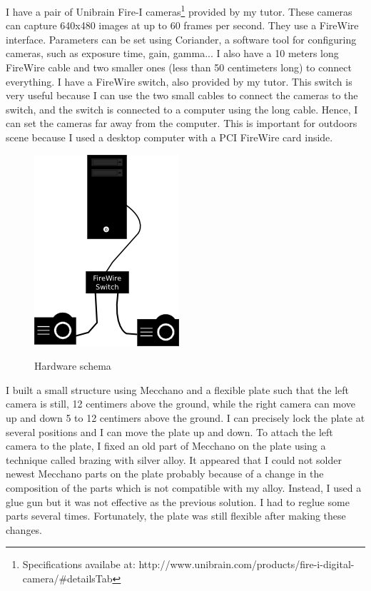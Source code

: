 \documentclass[12pt]{article}
\begin{document}
I have a pair of Unibrain Fire-I cameras\footnote{Specifications availabe at: http://www.unibrain.com/products/fire-i-digital-camera/\#detailsTab} provided by my tutor. These cameras can capture 640x480 images at up to 60 frames per second. They use a FireWire interface. Parameters can be set using Coriander, a software tool for configuring cameras, such as exposure time, gain, gamma... I also have a 10 meters long FireWire cable and two smaller ones (less than 50 centimeters long) to connect everything. I have a FireWire switch, also provided by my tutor. This switch is very useful because I can use the two small cables to connect the cameras to the switch, and the switch is connected to a computer using the long cable. Hence, I can set the cameras far away from the computer. This is important for outdoors scene because I used a desktop computer with a PCI FireWire card inside.
\begin{figure}[h]
    \begin{center}
        \includegraphics[scale=0.2]{images/setup.png} 
        \label{fig:hardware-schema}
        \caption{Hardware schema}
    \end{center}
\end{figure}

I built a small structure using Mecchano and a flexible plate such that the left camera is still, 12 centimers above the ground, while the right camera can move up and down 5 to 12 centimers above the ground. I can precisely lock the plate at several positions and I can move the plate up and down. To attach the left camera to the plate, I fixed an old part of Mecchano on the plate using a technique called brazing with silver alloy. It appeared that I could not solder newest Mecchano parts on the plate probably because of a change in the composition of the parts which is not compatible with my alloy. Instead, I used a glue gun but it was not effective as the previous solution. I had to reglue some parts several times. Fortunately, the plate was still flexible after making these changes.
\end{document}
